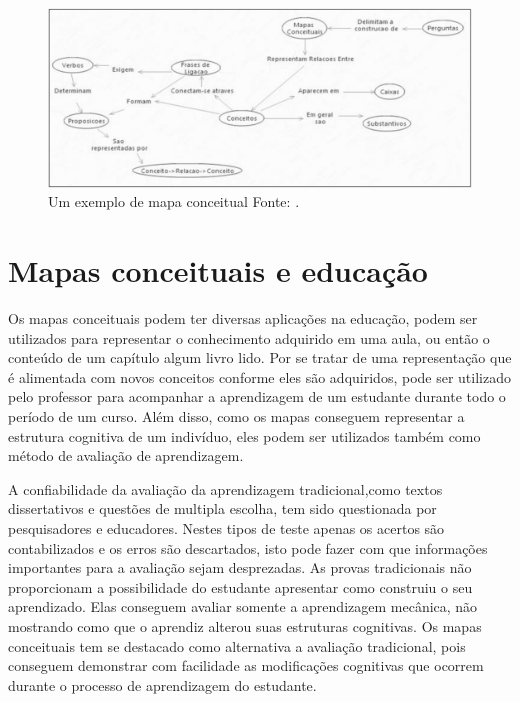 \documentclass[
	12pt,				%
	openright,			%
	oneside,			%
	a4paper,			%
	english,			%
	french,				%
	spanish,			%
	brazil				%
	]{abntex2}
\begin{document}
\begin{figure}[htb]
	\begin{center}
		\includegraphics[scale=0.3]{mapaconceitual.png}
	\end{center}
	\caption{\label{fig_mapconceitual}Um exemplo de mapa conceitual Fonte: \cite[p. 28]{Perin2014}.}
\end{figure}
\section{Mapas conceituais e educação}
Os mapas conceituais podem ter diversas aplicações na educação, podem ser utilizados para representar o conhecimento adquirido em uma aula, ou então o conteúdo de um capítulo algum livro lido. Por se tratar de uma representação que é alimentada com novos conceitos conforme eles são adquiridos, pode ser utilizado pelo professor para acompanhar a aprendizagem de um estudante durante todo o período de um curso. Além disso, como os mapas conseguem representar a estrutura cognitiva de um indivíduo, eles podem ser utilizados também como método de avaliação de aprendizagem\cite{Perin2014}.

A confiabilidade da avaliação da aprendizagem tradicional,como textos dissertativos e questões de multipla escolha, tem sido questionada por pesquisadores e educadores. Nestes tipos de teste apenas os acertos são contabilizados e os erros são descartados, isto pode fazer com que informações importantes para a avaliação sejam desprezadas.
As provas tradicionais não proporcionam a possibilidade do estudante apresentar como construiu o seu aprendizado. Elas conseguem avaliar somente a aprendizagem mecânica, não mostrando como que o aprendiz alterou suas estruturas cognitivas.
Os mapas conceituais tem se destacado como alternativa a avaliação tradicional, pois conseguem demonstrar com facilidade as modificações cognitivas que ocorrem durante o processo de aprendizagem do estudante\cite{Dutra2002}.
\end{document}
